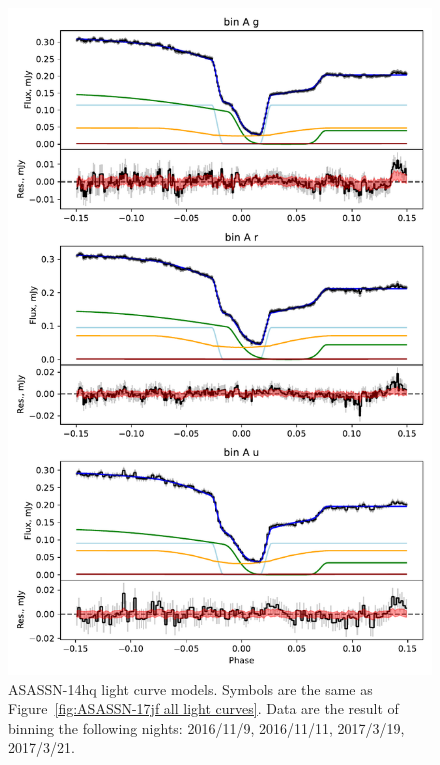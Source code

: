 \begin{figure}
    \centering
    \includegraphics[width=\textwidth]{figures/results/ASASSN-14hq/ASASSN-14hq_1.pdf}
    \caption{ASASSN-14hq light curve models. Symbols are the same as Figure~\ref{fig:ASASSN-17jf all light curves}. Data are the result of binning the following nights: 2016/11/9, 2016/11/11, 2017/3/19, 2017/3/21.}
    \label{fig:ASASSN-14hq all light curves}
\end{figure}
